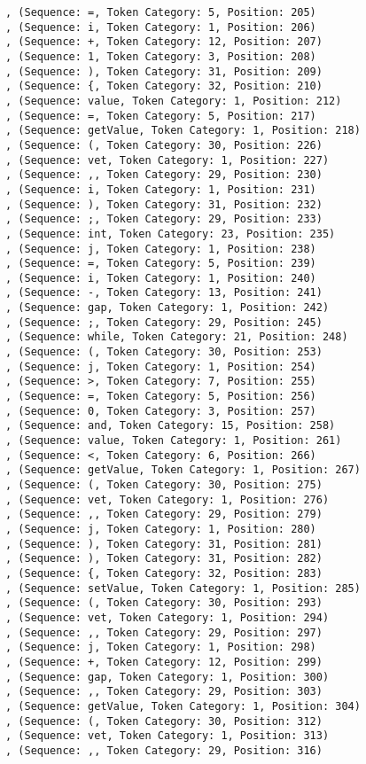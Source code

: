 \documentclass[a4paper, 12pt, article]{memoir}
\begin{document}
\begin{lstlisting}
, (Sequence: =, Token Category: 5, Position: 205)
, (Sequence: i, Token Category: 1, Position: 206)
, (Sequence: +, Token Category: 12, Position: 207)
, (Sequence: 1, Token Category: 3, Position: 208)
, (Sequence: ), Token Category: 31, Position: 209)
, (Sequence: {, Token Category: 32, Position: 210)
, (Sequence: value, Token Category: 1, Position: 212)
, (Sequence: =, Token Category: 5, Position: 217)
, (Sequence: getValue, Token Category: 1, Position: 218)
, (Sequence: (, Token Category: 30, Position: 226)
, (Sequence: vet, Token Category: 1, Position: 227)
, (Sequence: ,, Token Category: 29, Position: 230)
, (Sequence: i, Token Category: 1, Position: 231)
, (Sequence: ), Token Category: 31, Position: 232)
, (Sequence: ;, Token Category: 29, Position: 233)
, (Sequence: int, Token Category: 23, Position: 235)
, (Sequence: j, Token Category: 1, Position: 238)
, (Sequence: =, Token Category: 5, Position: 239)
, (Sequence: i, Token Category: 1, Position: 240)
, (Sequence: -, Token Category: 13, Position: 241)
, (Sequence: gap, Token Category: 1, Position: 242)
, (Sequence: ;, Token Category: 29, Position: 245)
, (Sequence: while, Token Category: 21, Position: 248)
, (Sequence: (, Token Category: 30, Position: 253)
, (Sequence: j, Token Category: 1, Position: 254)
, (Sequence: >, Token Category: 7, Position: 255)
, (Sequence: =, Token Category: 5, Position: 256)
, (Sequence: 0, Token Category: 3, Position: 257)
, (Sequence: and, Token Category: 15, Position: 258)
, (Sequence: value, Token Category: 1, Position: 261)
, (Sequence: <, Token Category: 6, Position: 266)
, (Sequence: getValue, Token Category: 1, Position: 267)
, (Sequence: (, Token Category: 30, Position: 275)
, (Sequence: vet, Token Category: 1, Position: 276)
, (Sequence: ,, Token Category: 29, Position: 279)
, (Sequence: j, Token Category: 1, Position: 280)
, (Sequence: ), Token Category: 31, Position: 281)
, (Sequence: ), Token Category: 31, Position: 282)
, (Sequence: {, Token Category: 32, Position: 283)
, (Sequence: setValue, Token Category: 1, Position: 285)
, (Sequence: (, Token Category: 30, Position: 293)
, (Sequence: vet, Token Category: 1, Position: 294)
, (Sequence: ,, Token Category: 29, Position: 297)
, (Sequence: j, Token Category: 1, Position: 298)
, (Sequence: +, Token Category: 12, Position: 299)
, (Sequence: gap, Token Category: 1, Position: 300)
, (Sequence: ,, Token Category: 29, Position: 303)
, (Sequence: getValue, Token Category: 1, Position: 304)
, (Sequence: (, Token Category: 30, Position: 312)
, (Sequence: vet, Token Category: 1, Position: 313)
, (Sequence: ,, Token Category: 29, Position: 316)

\end{lstlisting}
\end{document}

